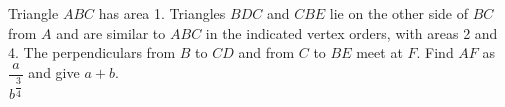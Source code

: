 Triangle $ABC$ has area 1. Triangles $BDC$ and $CBE$ lie on the other side of $BC$ from $A$ and are similar to $ABC$ in the indicated vertex orders, with areas 2 and 4. The perpendiculars from $B$ to $CD$ and from $C$ to $BE$ meet at $F$. Find $AF$ as $\dfrac{a}{b^{\dfrac{3}{4}}}$ and give $a+b$.
